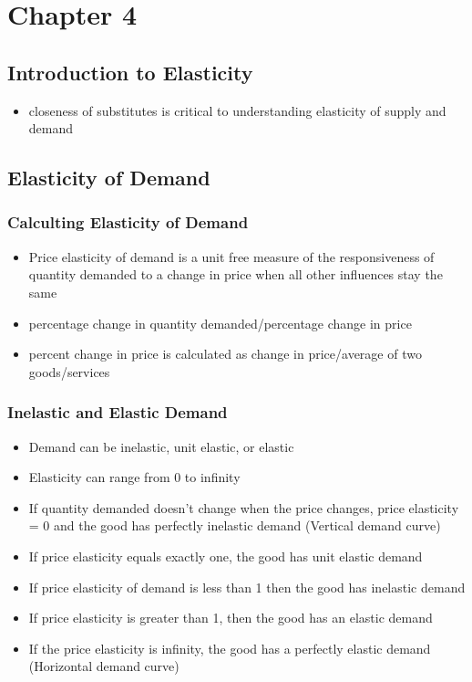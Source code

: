 \documentclass[11pt]{article}
\author{Sudhan Chitgopkar}
\date{\today}
\title{}
\begin{document}
\tableofcontents

\section{Chapter 4}
\label{sec:org9174945}
\subsection{Introduction to Elasticity}
\label{sec:org6f81f5e}
\begin{itemize}
\item closeness of substitutes is critical to understanding elasticity of supply and demand
\end{itemize}
\subsection{Elasticity of Demand}
\label{sec:org81eed05}
\subsubsection{Calculting Elasticity of Demand}
\label{sec:org164da64}
\begin{itemize}
\item Price elasticity of demand is a unit free measure of the responsiveness of quantity 
demanded to a change in price when all other influences stay the same
\item percentage change in quantity demanded/percentage change in price
\item percent change in price is calculated as change in price/average of two goods/services
\end{itemize}
\subsubsection{Inelastic and Elastic Demand}
\label{sec:orgcb36d47}
\begin{itemize}
\item Demand can be inelastic, unit elastic, or elastic
\item Elasticity can range from 0 to infinity
\item If quantity demanded doesn't change when the price changes, price elasticity = 0 and the good
has perfectly inelastic demand (Vertical demand curve)
\item If price elasticity equals exactly one, the good has unit elastic demand
\item If price elasticity of demand is less than 1 then the good has inelastic demand
\item If price elasticity is greater than 1, then the good has an elastic demand
\item If the price elasticity is infinity, the good has a perfectly 
elastic demand (Horizontal demand curve)
\end{itemize}
\end{document}
